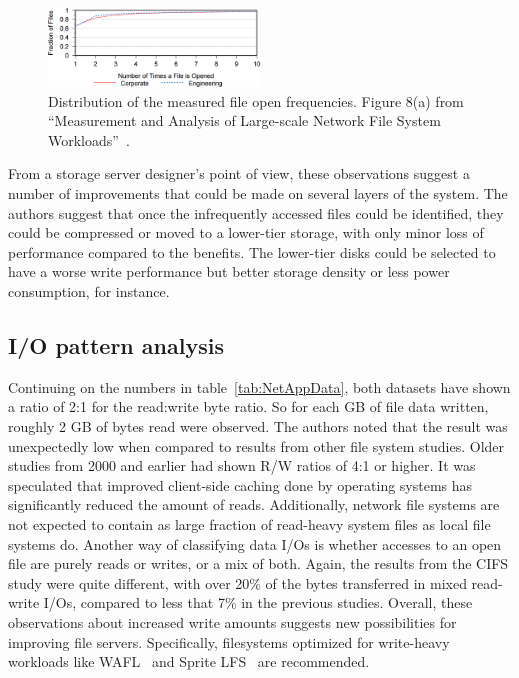 \begin{figure}[h]
\centering\includegraphics[width=0.5\textwidth]{images/netapp-file-opens.png}
\caption{Distribution of the measured file open frequencies. Figure 8(a) from ``Measurement and Analysis of Large-scale Network File System Workloads''~\cite{NFSv4Better}.}
\label{fig:NetAppFileOpens}
\end{figure}

From a storage server designer's point of view,
these observations suggest a number of improvements that could be made on several layers of the system.
The authors suggest that once the infrequently accessed files could be identified,
they could be compressed or moved to a lower-tier storage,
with only minor loss of performance compared to the benefits.
The lower-tier disks could be selected to have a worse write performance
but better storage density or less power consumption, for instance.

\subsection{I/O pattern analysis}
Continuing on the numbers in table~\ref{tab:NetAppData},
both datasets have shown a ratio of 2:1 for the read:write byte ratio.
So for each GB of file data written, roughly 2 GB of bytes read were observed.
The authors noted that the result was unexpectedly low when compared to results from other file system studies.
Older studies from 2000 and earlier had shown R/W ratios of 4:1 or higher.
It was speculated that improved client-side caching done by operating systems
has significantly reduced the amount of reads.
Additionally, network file systems are not expected to contain as large fraction of read-heavy system files as local file systems do.
Another way of classifying data I/Os is whether accesses to an open file are purely reads or writes, or a mix of both.
Again, the results from the CIFS study were quite different,
with over 20\% of the bytes transferred in mixed read-write I/Os,
compared to less that 7\% in the previous studies.
Overall, these observations about increased write amounts suggests new possibilities for improving file servers.
Specifically, filesystems optimized for write-heavy workloads like WAFL~\cite{WAFL} and Sprite LFS~\cite{SpriteLfs} are recommended.

